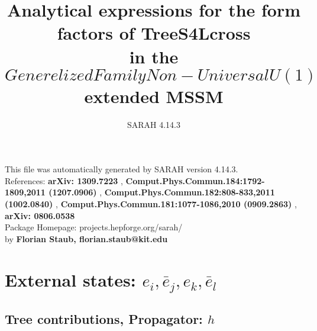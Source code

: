 \documentclass[A4,landscape]{article}
\begin{document}
\title{Analytical expressions for the form factors of TreeS4Lcross\\ in the $Generelized Family Non-Universal U(1)$ extended MSSM } 
 \author{SARAH 4.14.3} 
 \maketitle 
 \vspace{10cm} 
This file was automatically generated by SARAH version 4.14.3.  \\ 
References: {\bf arXiv: 1309.7223 }, {\bf Comput.Phys.Commun.184:1792-1809,2011 (1207.0906) }, {\bf Comput.Phys.Commun.182:808-833,2011 (1002.0840) }, {\bf Comput.Phys.Commun.181:1077-1086,2010 (0909.2863) }, {\bf arXiv: 0806.0538 } \\ 
Package Homepage: projects.hepforge.org/sarah/ \\ 
by {\bf Florian Staub, florian.staub@kit.edu} 
 \pagebreak 
 \tableofcontents 
 \pagebreak 
\section{External states: ${e_{{i}}, \bar{e}_{{j}}, e_{{k}}, \bar{e}_{{l}}}$} 
\subsection{Tree contributions, Propagator: $h$} 
\end{document}
